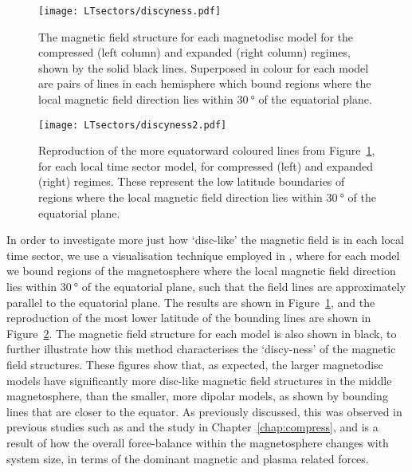 \begin{figure}
\centering
\texttt{[image: LTsectors/discyness.pdf]}
\caption[Model magnetic field structures for different local time sectors, with bounding lines showing regions where the magnetic field direction is within $\SI{30}{\degree}$ of the equatorial plane.]{The magnetic field structure for each magnetodisc model for the compressed (left column) and expanded (right column) regimes, shown by the solid black lines. Superposed in colour for each model are pairs of lines in each hemisphere which bound regions where the local magnetic field direction lies within $\SI{30}{\degree}$ of the equatorial plane.}
\label{LTsectors:fig:discyness}
\end{figure}

\begin{figure}
\centering
\texttt{[image: LTsectors/discyness2.pdf]}
\caption[Reproduction of the lower latitude bounding lines from Figure~\ref{LTsectors:fig:discyness}.]{Reproduction of the more equatorward coloured lines from Figure~\ref{LTsectors:fig:discyness}, for each local time sector model, for compressed (left) and expanded (right) regimes. These represent the low latitude boundaries of regions where the local magnetic field direction lies within $\SI{30}{\degree}$ of the equatorial plane.}
\label{LTsectors:fig:discyness2}
\end{figure}

In order to investigate more just how `disc-like' the magnetic field is in each local time sector, we use a visualisation technique employed in \citet{bunce2008}, where for each model we bound regions of the magnetosphere where the local magnetic field direction lies within $\SI{30}{\degree}$ of the equatorial plane, such that the field lines are approximately parallel to the equatorial plane. The results are shown in Figure~\ref{LTsectors:fig:discyness}, and the reproduction of the most lower latitude of the bounding lines are shown in Figure~\ref{LTsectors:fig:discyness2}. The magnetic field structure for each model is also shown in black, to further illustrate how this method characterises the `discy-ness' of the magnetic field structures. These figures show that, as expected, the larger magnetodisc models have significantly more disc-like magnetic field structures in the middle magnetosphere, than the smaller, more dipolar models, as shown by bounding lines that are closer to the equator. As previously discussed, this was observed in previous studies such as \citet{achilleos2010a} and the study in Chapter~\ref{chap:compress}, and is a result of how the overall force-balance within the magnetosphere changes with system size, in terms of the dominant magnetic and plasma related forces. 


